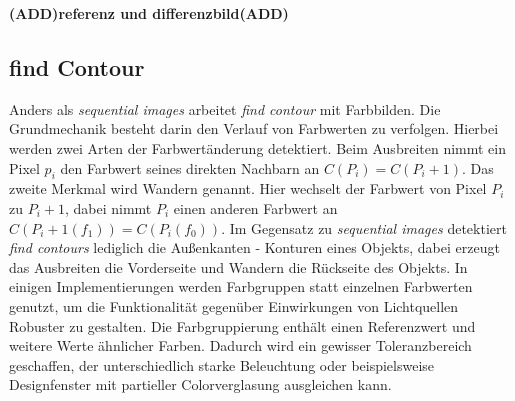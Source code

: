 		\textbf{(ADD)referenz und differenzbild(ADD)}
		
	
		\subsection{find Contour}
		Anders als \textit{sequential images} arbeitet \textit{find contour} mit Farbbilden. Die Grundmechanik besteht darin den Verlauf von Farbwerten zu verfolgen. Hierbei werden zwei Arten der Farbwertänderung detektiert. Beim Ausbreiten nimmt ein Pixel $p_i$  den Farbwert seines direkten Nachbarn an $C(P_i) = C(P_i+1)$. Das zweite Merkmal wird Wandern genannt. Hier wechselt der Farbwert von Pixel $P_i$ zu $P_i+1$, dabei nimmt $P_i$ einen anderen Farbwert an $C(P_i+1(f_1)) = C(P_i(f_0))$. Im Gegensatz zu \textit{sequential images} detektiert \textit{find contours} lediglich die Außenkanten - Konturen eines Objekts, dabei erzeugt das Ausbreiten die Vorderseite und Wandern die Rückseite des Objekts. In einigen Implementierungen werden Farbgruppen statt einzelnen Farbwerten genutzt, um die Funktionalität gegenüber Einwirkungen von Lichtquellen Robuster zu gestalten. Die Farbgruppierung enthält einen Referenzwert und weitere Werte ähnlicher Farben. Dadurch wird ein gewisser Toleranzbereich geschaffen, der unterschiedlich starke Beleuchtung oder beispielsweise Designfenster mit partieller Colorverglasung ausgleichen kann.
		
